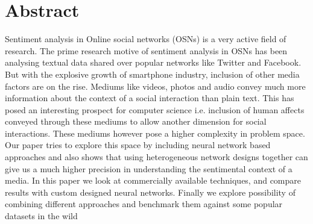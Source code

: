 \section{Abstract}
Sentiment analysis in Online social networks (OSNs) is a very active field of research. The prime research motive of sentiment analysis in OSNs has been analysing textual data shared over popular networks like Twitter and Facebook. But with the explosive growth of smartphone industry, inclusion of other media factors are on the rise. Mediums like videos, photos and audio convey much more information about the context of a social interaction than plain text. This has posed an interesting prospect for computer science i.e. inclusion of human affects conveyed through these mediums to allow another dimension for social interactions. These mediums however pose a higher complexity in problem space. Our paper tries to explore this space by including neural network based approaches and also shows that using heterogeneous network designs together can give us a much higher precision in understanding the sentimental context of a media. In this paper we look at commercially available techniques, and compare results with custom designed neural networks. Finally we explore possibility of combining different approaches and benchmark them against some popular datasets in the wild 